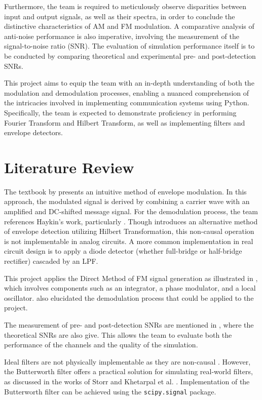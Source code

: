 \documentclass[../ECE459FinalProjectReport.tex]{subfiles}
\begin{document}
Furthermore, the team is required to meticulously observe disparities between input and output signals, as well as their spectra, in order to conclude the distinctive characteristics of AM and FM modulation. A comparative analysis of anti-noise performance is also imperative, involving the measurement of the signal-to-noise ratio (SNR). The evaluation of simulation performance itself is to be conducted by comparing theoretical and experimental pre- and post-detection SNRs.

This project aims to equip the team with an in-depth understanding of both the modulation and demodulation processes, enabling a nuanced comprehension of the intricacies involved in implementing communication systems using Python. Specifically, the team is expected to demonstrate proficiency in performing Fourier Transform and Hilbert Transform, as well as implementing filters and envelope detectors.


\section{Literature Review}

The textbook by \textcite[Sec. 3.1]{haykinIntroductionAnalogDigital2007} presents an intuitive method of envelope modulation. In this approach, the modulated signal is derived by combining a carrier wave with an amplified and DC-shifted message signal. For the demodulation process, the team references Haykin's work, particularly \cite[Fig. 9.8]{haykinIntroductionAnalogDigital2007}. Though \textcite{ulrichEnvelopeCalculationHilbert2006} introduces an alternative method of envelope detection utilizing Hilbert Transformation, this non-causal operation is not implementable in analog circuits. A more common implementation in real circuit design is to apply a diode detector (whether full-bridge or half-bridge rectifier) cascaded by an LPF.

This project applies the Direct Method of FM signal generation as illustrated in \cite[Fig. 4.7]{haykinIntroductionAnalogDigital2007}, which involves components such as an integrator, a phase modulator, and a local oscillator. \cite[Fig. 9.13]{haykinIntroductionAnalogDigital2007} also elucidated the demodulation process that could be applied to the project.

The measurement of pre- and post-detection SNRs are mentioned in \cite[Sec. 9.5 \& 9.7]{haykinIntroductionAnalogDigital2007}, where the theoretical SNRs are also give. This allows the team to evaluate both the performance of the channels and the quality of the simulation.

Ideal filters are not physically implementable as they are non-causal \cite[p. 428]{kudekiAnalogSignalsSystems2009}. However, the Butterworth filter offers a practical solution for simulating real-world filters, as discussed in the works of Storr \cite{storrButterworthFilterDesign2013} and Khetarpal et al. \cite{khetarpalZaiPythonZhongShiXianDiTongLuBoQi2022}. Implementation of the Butterworth filter can be achieved using the \verb|scipy.signal| package.
\end{document}
